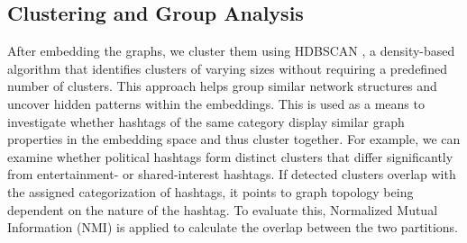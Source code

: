 
\subsection{Clustering and Group Analysis}

After embedding the graphs, we cluster them using HDBSCAN \citep{hdbscan_paper, sklearn}, a density-based algorithm that identifies clusters of varying sizes without requiring a predefined number of clusters. This approach helps group similar network structures and uncover hidden patterns within the embeddings. This is used as a means to investigate whether hashtags of the same category display similar graph properties in the embedding space and thus cluster together. For example, we can examine whether political hashtags form distinct clusters that differ significantly from entertainment- or shared-interest hashtags. If detected clusters overlap with the assigned categorization of hashtags, it points to graph topology being dependent on the nature of the hashtag. To evaluate this, Normalized Mutual Information (NMI) is applied to calculate the overlap between the two partitions. 
